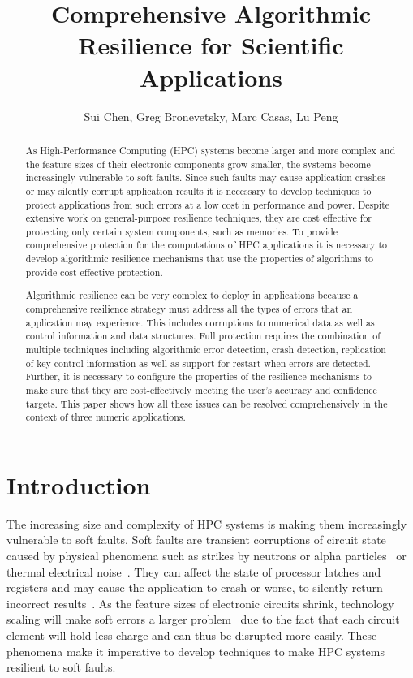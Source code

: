\documentclass{sig-alternate}
\title{Comprehensive Algorithmic Resilience for Scientific Applications }
\author{Sui Chen,
Greg Bronevetsky, Marc Casas,
Lu Peng
}
\begin{document}
\maketitle

\begin{abstract}
As High-Performance Computing (HPC) systems become larger and more complex and the feature sizes of their electronic components grow smaller, the systems become increasingly vulnerable to soft faults.
Since such faults may cause application crashes or may silently corrupt application results it is necessary to develop techniques to protect applications from such errors at a low cost in performance and power.
Despite extensive work on general-purpose resilience techniques, they are cost effective for protecting only certain system components, such as memories.
To provide comprehensive protection for the computations of HPC applications it is necessary to develop algorithmic resilience mechanisms that use the properties of algorithms to provide cost-effective protection.

Algorithmic resilience can be very complex to deploy in applications because a comprehensive resilience strategy must address all the types of errors that an application may experience.
This includes corruptions to numerical data as well as control information and data structures.
Full protection requires the combination of multiple techniques including algorithmic error detection, crash detection, replication of key control information as well as support for restart when errors are detected.
Further, it is necessary to configure the properties of the resilience mechanisms to make sure that they are cost-effectively meeting the user's accuracy and confidence targets. 
This paper shows how all these issues can be resolved comprehensively in the context of three numeric applications.

\end{abstract}

\section{Introduction}
\label{sec:intro}

The increasing size and complexity of HPC systems is making them increasingly vulnerable to soft faults.
Soft faults are transient corruptions of circuit state caused by physical phenomena such as strikes by neutrons or alpha particles~\cite{baumann:2005, asciQSER:2005} or thermal electrical noise~\cite{therm_noise:2007}.
They can affect the state of processor latches and registers and may cause the application to crash or worse, to silently return incorrect results~\cite{mpi_ser:reed:2004}.
As the feature sizes of electronic circuits shrink, technology scaling will make soft errors a larger problem~\cite{err_scaling:2012} due to the fact that each circuit element will hold less charge and can thus be disrupted more easily.
These phenomena make it imperative to develop techniques to make HPC systems resilient to soft faults.
\end{document}
